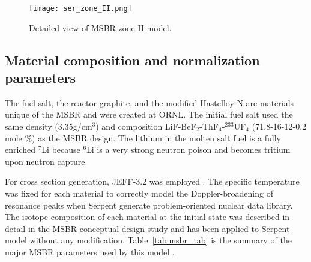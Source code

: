 \begin{figure}[hbp!] %
  \centering
  \vspace{-0.3em}
  \texttt{[image: ser\_zone\_II.png]}
  \caption{Detailed view of \gls{MSBR} zone II model.}
  \vspace{-0.6em}
  \label{fig:serpent_zoneII}
\end{figure}
\FloatBarrier

\subsection{Material composition and normalization parameters}
The fuel salt, the reactor graphite, and the modified Hastelloy-N are materials 
unique of the \gls{MSBR} and were created at \gls{ORNL}. The initial fuel salt used the same density (3.35g/cm$^3$) and composition LiF-BeF$_2$-ThF$_4$-$^{233}$UF$_4$ (71.8-16-12-0.2 mole \%) as the \gls{MSBR} design\cite{robertson_conceptual_1971}. The lithium in the molten salt fuel is a fully enriched $^{7}$Li because $^{6}$Li is a very strong neutron poison and becomes tritium upon neutron capture. 

For cross section generation, JEFF-3.2 was employed 
\cite{oecd/nea_data_bank_jeff-3.2_2014}. The specific temperature was fixed for each material to correctly model the Doppler-broadening of resonance peaks when 
Serpent generate problem-oriented nuclear data library. The isotope composition of each material at the initial state was described in detail in the MSBR conceptual design study \cite{robertson_conceptual_1971} and has been applied to Serpent model without any modification. Table~\ref{tab:msbr_tab} is the summary of the major \gls{MSBR} parameters used by this model \cite{robertson_conceptual_1971}. 

